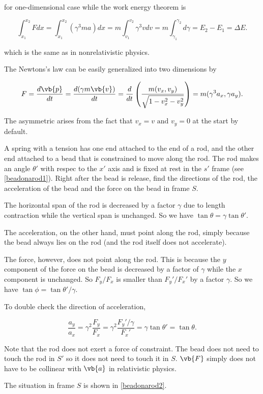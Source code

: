 \documentclass[english,a4paper,12pt]{report}
\begin{document}
for one-dimensional case while the work energy theorem is 

\begin{equation}
    \int_{x_1 }^{x_2 } Fdx = \int_{x_1 }^{x_2 } (\gamma ^3 ma) dx = m \int_{v_1 }^{v_2 } \gamma ^3 vdv = m \int_{\gamma _{1} }^{\gamma _{2} } d\gamma = E_2 - E_1 = \Delta E.      
\end{equation}

which is the same as in nonrelativistic physics.

The Newtons's law can be easily generalized into two dimensions by 

\begin{equation}
    F = \frac{d\vb{p} }{dt} = \frac{d(\gamma m\vb{v} )}{dt} = \frac{d}{dt} \left(\frac{m(v_{x}, v_{y}  )}{\sqrt{1 - v_{x}^2 - v_{y}^2  } }\right) = m(\gamma ^3 a_{x}, \gamma a_{y}  ).    
\end{equation}

The asymmetric arises from the fact that \(v_{x} = v \text { and }  v_{y} = 0 \) at the start by default.

{A spring with a tension has one end attached to the end of a rod, and the other end attached to a bead that is constrained to move along the rod. The rod makes an angle \(\theta '\) with respec to the \(x'\) axis and is fixed at rest in the \(s'\) frame (see \cref{beadonarod1}). Right after the bead is release, find the directions of the rod, the acceleration of the bead and the force on the bead in frame \(S\).}
{The horizontal span of the rod is decreased by a factor \(\gamma \) due to length contraction while the vertical span is unchanged. So we have \(\tan \theta = \gamma \tan \theta '\). 

The acceleration, on the other hand, must point along the rod, simply because the bead always lies on the rod (and the rod itself does not accelerate). 

The force, however, does not point along the rod. This is because the \(y\) component of the force on the bead is decreased by a factor of \(\gamma \) while the \(x\) component is unchanged. So \(F_{y}/F_{x}   \) is smaller than \(F_{y}'/F_{x}'   \) by a factor \(\gamma \). So we have \(\tan \phi = \tan \theta ' /\gamma  \). 

To double check the direction of acceleration, 

\begin{equation}
    \frac{a_{y} }{a_{x} } = \gamma ^2 \frac{F_{y} }{F_{x} } = \gamma ^2\frac{F_{y}' /\gamma    }{F_{x}' }  = \gamma \tan \theta ' = \tan \theta .  
\end{equation}

Note that the rod does not exert a force of constraint. The bead does not need to touch the rod in \(S'\) so it does not need to touch it in \(S\). \(\vb{F} \) simply does not have to be collinear with \(\vb{a} \) in relativistic physics.  

The situation in frame \(S\) is shown in \cref{beadonarod2}.

} 
\end{document}
